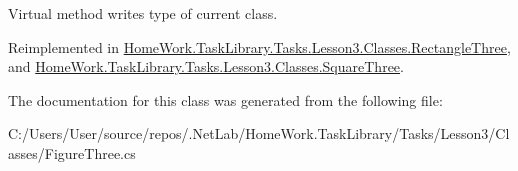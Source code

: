 Virtual method writes type of current class. 



Reimplemented in \mbox{\hyperlink{class_home_work_1_1_task_library_1_1_tasks_1_1_lesson3_1_1_classes_1_1_rectangle_three_a8d5829e8082b1f5e8adbf8ecf91c6f70}{Home\+Work.\+Task\+Library.\+Tasks.\+Lesson3.\+Classes.\+Rectangle\+Three}}, and \mbox{\hyperlink{class_home_work_1_1_task_library_1_1_tasks_1_1_lesson3_1_1_classes_1_1_square_three_ab8713407ad8a5ba3f38785748aaa1847}{Home\+Work.\+Task\+Library.\+Tasks.\+Lesson3.\+Classes.\+Square\+Three}}.



The documentation for this class was generated from the following file\+:\begin{DoxyCompactItemize}
\item 
C\+:/\+Users/\+User/source/repos/.\+Net\+Lab/\+Home\+Work.\+Task\+Library/\+Tasks/\+Lesson3/\+Classes/Figure\+Three.\+cs\end{DoxyCompactItemize}
